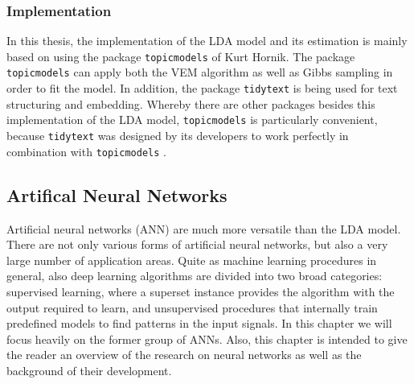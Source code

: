 \documentclass[11pt,a4paper]{article}
\begin{document}
\subsubsection{Implementation}

In this thesis, the implementation of the LDA model and its estimation is mainly based on using the package \texttt{topicmodels} of Kurt Hornik. The package \texttt{topicmodels} can apply both the VEM algorithm as well as Gibbs sampling in order to fit the model. In addition, the package \texttt{tidytext} is being used for text structuring and embedding. Whereby there are other packages besides this implementation of the LDA model, \texttt{topicmodels} is particularly convenient, because \texttt{tidytext} was designed by its developers to work perfectly in combination with \texttt{topicmodels} \cite[p. 89]{Silge2017}.


\subsection{Artifical Neural Networks}

Artificial neural networks (ANN) are much more versatile than the LDA model. There are not only various forms of artificial neural networks, but also a very large number of application areas. Quite as machine learning procedures in general, also deep learning algorithms are divided into two broad categories: supervised learning, where a superset instance provides the algorithm with the output required to learn, and unsupervised procedures that internally train predefined models to find patterns in the input signals. In this chapter we will focus heavily on the former group of ANNs. Also, this chapter is intended to give the reader an overview of the research on neural networks as well as the background of their development. \\
\end{document}
